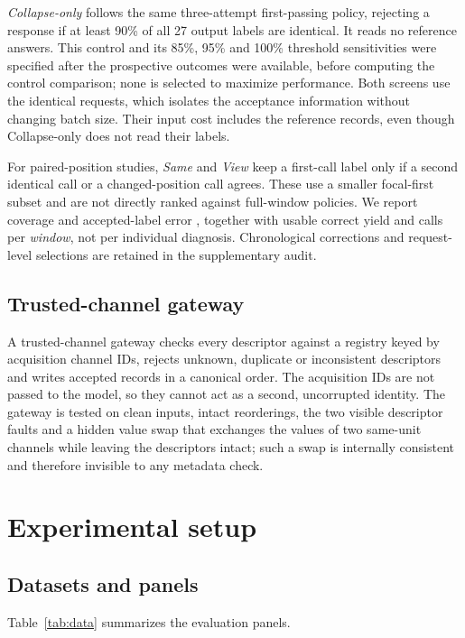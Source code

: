 \documentclass[11pt,a4paper]{article}
\begin{document}
\emph{Collapse-only} follows the same three-attempt first-passing policy, rejecting a response if at least 90\% of all 27 output labels are identical. It reads no reference answers. This control and its 85\%, 95\% and 100\% threshold sensitivities were specified after the prospective outcomes were available, before computing the control comparison; none is selected to maximize performance. Both screens use the identical requests, which isolates the acceptance information without changing batch size. Their input cost includes the reference records, even though Collapse-only does not read their labels.

For paired-position studies, \emph{Same} and \emph{View} keep a first-call label only if a second identical call or a changed-position call agrees. These use a smaller focal-first subset and are not directly ranked against full-window policies. We report coverage and accepted-label error \citep{geifman2017selective}, together with usable correct yield and calls per \emph{window}, not per individual diagnosis. Chronological corrections and request-level selections are retained in the supplementary audit.

\subsection{Trusted-channel gateway}
A trusted-channel gateway checks every descriptor against a registry keyed by acquisition channel IDs, rejects unknown, duplicate or inconsistent descriptors and writes accepted records in a canonical order. The acquisition IDs are not passed to the model, so they cannot act as a second, uncorrupted identity. The gateway is tested on clean inputs, intact reorderings, the two visible descriptor faults and a hidden value swap that exchanges the values of two same-unit channels while leaving the descriptors intact; such a swap is internally consistent and therefore invisible to any metadata check.

\section{Experimental setup}\label{sec:setup}
\subsection{Datasets and panels}
Table~\ref{tab:data} summarizes the evaluation panels.
\end{document}
